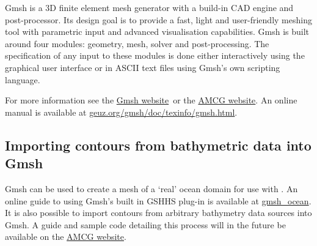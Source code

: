 Gmsh is a 3D finite element mesh generator with a build-in CAD engine and post-processor.
Its design goal is to provide a fast, light and user-friendly meshing tool with parametric
input and advanced visualisation capabilities. Gmsh is built around four modules: geometry, 
mesh, solver and post-processing. The specification of any input to these modules is done
either interactively using the graphical user interface or in ASCII text files using Gmsh's
own scripting language. 

For more information see the \href{http://geuz.org/gmsh/}{Gmsh website}\ or the \href{http://amcg.ese.ic.ac.uk}{AMCG
website}. An online manual is available at \href{http://geuz.org/gmsh/doc/texinfo/gmsh.html}{geuz.org/gmsh/doc/texinfo/gmsh.html}.

\subsection{Importing contours from bathymetric data into Gmsh}

Gmsh can be used to create a mesh of a `real' ocean domain for use with \fluidity. An online guide to using Gmsh's built in
GSHHS plug-in is available at \href{http://perso.uclouvain.be/jonathan.lambrechts/gmsh_ocean/}{gmsh\_ocean}.
It is also possible to import contours from arbitrary bathymetry data sources into Gmsh. A guide and sample code detailing this process will
in the future be available on the \href{http://amcg.ese.ic.ac.uk}{AMCG website}.
